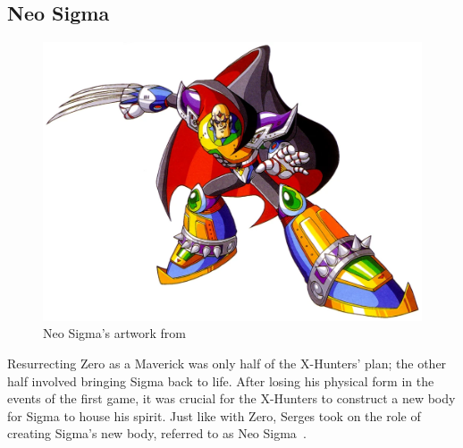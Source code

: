 \subsection{Neo Sigma}\label{boss:Sigma_x2}
\begin{figure}[htp]
	\centering
	\includegraphics[height=\portraitsize]{figures/X2/Hunter_stages/Neo_Sigma.png}
	\caption{Neo Sigma's artwork from~\cite{book:MMX_Complete_art}}
\end{figure}
Resurrecting Zero as a Maverick was only half of the X-Hunters' plan; the other half involved bringing Sigma back to life. After losing his physical form in the events of the first game, it was crucial for the X-Hunters to construct a new body for Sigma to house his spirit. Just like with Zero, Serges took on the role of creating Sigma's new body, referred to as Neo Sigma~\cite{wayback:X2_resources}.
